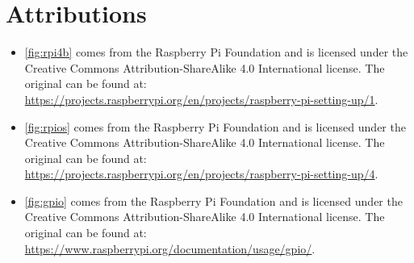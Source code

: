 \appendix
\appendixpage


\section{Attributions}

\begin{itemize}
    \item \autoref{fig:rpi4b} comes from the Raspberry Pi Foundation and is licensed under the Creative
          Commons Attribution-ShareAlike 4.0 International license. The original can be found at:
          \url{https://projects.raspberrypi.org/en/projects/raspberry-pi-setting-up/1}.

    \item \autoref{fig:rpios} comes from the Raspberry Pi Foundation and is licensed under the Creative
          Commons Attribution-ShareAlike 4.0 International license. The original can be found at:
          \url{https://projects.raspberrypi.org/en/projects/raspberry-pi-setting-up/4}.

    \item \autoref{fig:gpio} comes from the Raspberry Pi Foundation and is licensed under the Creative
          Commons Attribution-ShareAlike 4.0 International license. The original can be found at:
          \url{https://www.raspberrypi.org/documentation/usage/gpio/}.
\end{itemize}

\newpage
\clearpage